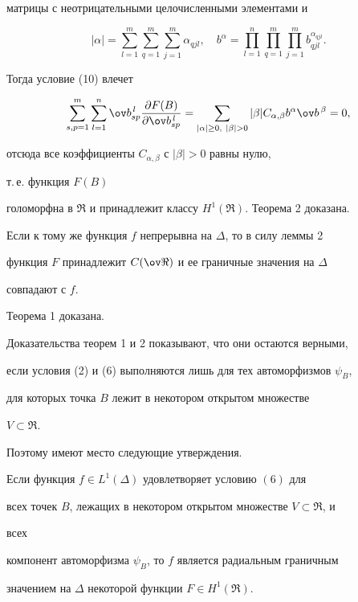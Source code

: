 матрицы с неотрицательными целочисленными элементами и 


$$ 


|\alpha|=\sum^m_{l=1}\sum^m_{q=1}\sum^m_{j=1} 


\alpha_{q j l},\quad 


b^\alpha=\prod^n_{l=1}\prod^m_{q=1}\prod^m_{j=1} 


b^{\alpha_{q j l}}_{q j l}. 


$$ 


Тогда условие (10) влечет 


$$ 


\sum^m_{s,p=1}\sum^n_{l=1} 


\ov b^{\,l}_{s p} 


\frac{\partial F(B)}{\partial\ov b^{\,l}_{s p}}= 


\sum_{|\alpha|\ge0,\ |\beta|>0}|\beta| 


C_{\alpha,\beta}b^\alpha\ov b^{\,\beta}=0, 


$$ 


отсюда все коэффициенты $C_{\alpha,\beta}$ с $|\beta|>0$ равны нулю, 


т.\,е. функция $F(B)$ 


голоморфна в $\Re$ и принадлежит классу $H^1(\Re)$. Теорема 2 доказана. 


 


Если к тому же функция $f$ непрерывна на $\Delta$, то в силу леммы 2 


функция $F$ принадлежит $C(\ov\Re)$ и ее граничные значения на $\Delta$ 


совпадают с $f$. 


Теорема 1 доказана. 


\medskip 


 


Доказательства теорем 1 и 2 показывают, что они остаются верными, 


если условия (2) и (6) выполняются лишь для тех автоморфизмов $\psi_B$, 


для которых точка $B$ лежит в некотором открытом множестве 


$V\subset\Re$. 


Поэтому имеют место следующие утверждения. 


 


\begin{thm} 


Если функция $f\in L^1(\Delta)$ удовлетворяет условию $(6)$ для 


всех точек $B$, лежащих в некотором открытом множестве $V\subset\Re$, и 


всех 


компонент автоморфизма $\psi_B$, то $f$ является радиальным граничным 


значением на $\Delta$ некоторой функции $F\in H^1(\Re)$. 


\end{thm} 


